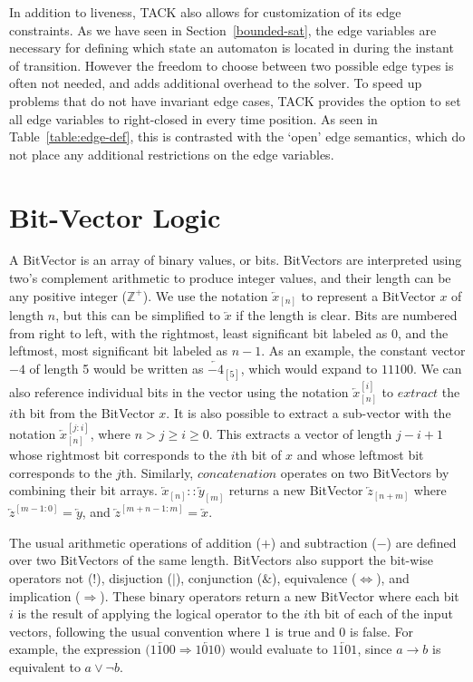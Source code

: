 \documentclass[a4paper,11pt]{report}
\newcommand*\BitAnd{\mathbin{\&}}
\newcommand*\BitOr{\mathbin{|}}
\newcommand{\BitNeg}{!}
\theoremstyle{definition}
\begin{document}
In addition to liveness, TACK also allows for customization of its edge
constraints. As we have seen in Section~\ref{bounded-sat}, the edge variables
are necessary for defining which state an automaton is located in during the
instant of transition. However the freedom to choose between two possible edge
types is often not needed, and adds additional overhead to the solver. To speed
up problems that do not have invariant edge cases, TACK provides the option to
set all edge variables to right-closed in every time position. As seen in
Table~\ref{table:edge-def}, this is contrasted with the `open' edge semantics,
which do not place any additional restrictions on the edge variables.


\section{Bit-Vector Logic}\label{bvlogic}
A BitVector is an array of binary values, or bits. BitVectors are interpreted
using two's complement arithmetic to produce integer values, and their length
can be any positive integer (\(\mathbb{Z}^+\)). We use the notation
\(\overleftarrow{x}_{[n]}\) to represent a BitVector \(x\) of length \(n\), but
this can be simplified to \(\overleftarrow{x}\) if the length is clear. Bits are
numbered from right to left, with the rightmost, least significant bit labeled
as 0, and the leftmost, most significant bit labeled as \(n-1\). As an example,
the constant vector \(-4\) of length 5 would be written as
\(\overleftarrow{-4}_{[5]}\), which would expand to \(11100\). We can also
reference individual bits in the vector using the notation
\(\overleftarrow{x}_{[n]}^{[i]}\) to \(extract\) the \(i\)th bit from the
BitVector \(x\). It is also possible to extract a sub-vector with the notation
\(\overleftarrow{x}_{[n]}^{[j:i]}\), where \(n>j\geq i\geq 0\). This extracts a
vector of length \(j-i+1\) whose rightmost bit corresponds to the \(i\)th bit of
\(x\) and whose leftmost bit corresponds to the \(j\)th. Similarly,
\(concatenation\) operates on two BitVectors by combining their bit arrays.
\(\overleftarrow{x}_{[n]} :: \overleftarrow{y}_{[m]}\) returns a new BitVector
\(\overleftarrow{z}_{[n+m]}\) where \(\overleftarrow{z}^{[m-1:0]} =
\overleftarrow{y}\), and \(\overleftarrow{z}^{[m+n-1:m]} = \overleftarrow{x}\).

The usual arithmetic operations of addition (\(+\)) and subtraction (\(-\)) are
defined over two BitVectors of the same length. BitVectors also support the
bit-wise operators not (\(\BitNeg\)), disjuction (\(\BitOr\)), conjunction (\(\BitAnd\)),
equivalence (\(\iff\)), and implication (\(\Rightarrow\)). These binary operators return a
new BitVector where each bit \(i\) is the result of applying the logical
operator to the \(i\)th bit of each of the input vectors, following the usual
convention where \(1\) is true and \(0\) is false. For example, the expression
\(\big( \overleftarrow{1100} \Rightarrow \overleftarrow{1010} \big) \) would
evaluate to \(\overleftarrow{1101}\), since \(a \rightarrow b\) is equivalent to
\(a \lor \neg b\).
\end{document}
